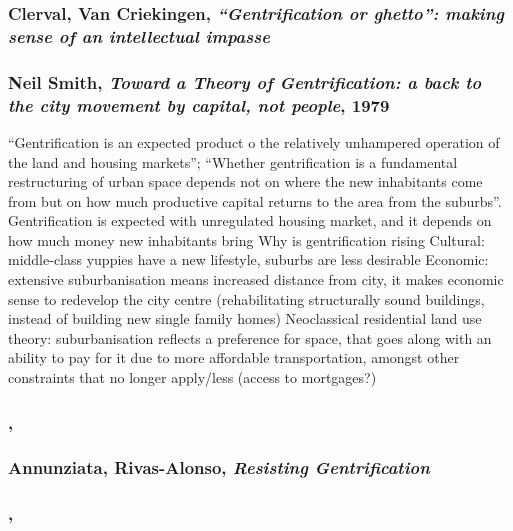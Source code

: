 \documentclass{article}
\begin{document}
\subsubsection{Clerval, Van Criekingen, \textit{``Gentrification or ghetto'': making sense of an intellectual impasse}}

\begin{outline}
	\1
\end{outline}

\subsubsection{Neil Smith, \textit{Toward a Theory of Gentrification: a back to the city movement by capital, not people}, 1979}

\begin{outline}
	\1 ``Gentrification is an expected product o the relatively unhampered operation of the land and housing markets''; ``Whether gentrification is a fundamental restructuring of urban space depends not on where the new inhabitants come from but on how much productive capital returns to the area from the suburbs''. Gentrification is expected with unregulated housing market, and it depends on how much money new inhabitants bring
	\1 Why is gentrification rising
		\2 Cultural: middle-class yuppies have a new lifestyle, suburbs are less desirable
		\2 Economic: extensive suburbanisation means increased distance from city, it makes economic sense to redevelop the city centre (rehabilitating structurally sound buildings, instead of building new single family homes)
	\1 Neoclassical residential land use theory: suburbanisation reflects a preference for space, that goes along with an ability to pay for it due to more affordable transportation, amongst other constraints that no longer apply/less (access to mortgages?)
	\1 
\end{outline}

\subsubsection{, \textit{}}

\begin{outline}
	\1
\end{outline}

\subsubsection{Annunziata, Rivas-Alonso, \textit{Resisting Gentrification}}

\begin{outline}
	\1
\end{outline}


\subsubsection{, \textit{}}

\begin{outline}
	\1
\end{outline}
\fi
\end{document}
